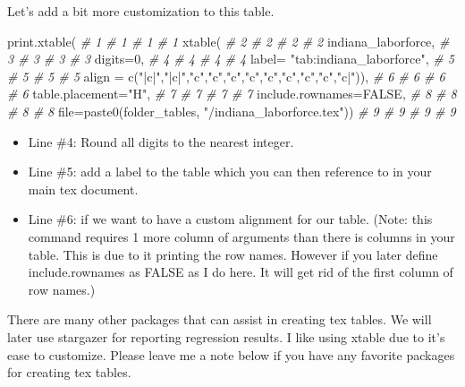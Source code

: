 \documentclass[
]{book}
\newenvironment{Shaded}{\begin{snugshade}}{\end{snugshade}}
\newcommand{\AttributeTok}[1]{\textcolor[rgb]{0.77,0.63,0.00}{#1}}
\newcommand{\CommentTok}[1]{\textcolor[rgb]{0.56,0.35,0.01}{\textit{#1}}}
\newcommand{\ConstantTok}[1]{\textcolor[rgb]{0.00,0.00,0.00}{#1}}
\newcommand{\DecValTok}[1]{\textcolor[rgb]{0.00,0.00,0.81}{#1}}
\newcommand{\FunctionTok}[1]{\textcolor[rgb]{0.00,0.00,0.00}{#1}}
\newcommand{\NormalTok}[1]{#1}
\newcommand{\StringTok}[1]{\textcolor[rgb]{0.31,0.60,0.02}{#1}}
\providecommand{\tightlist}{%
  \setlength{\itemsep}{0pt}\setlength{\parskip}{0pt}}
\begin{document}
Let's add a bit more customization to this table.

\begin{Shaded}
\begin{Highlighting}[]
\FunctionTok{print.xtable}\NormalTok{(                                                     }\CommentTok{\# 1  \# 1  \# 1  \# 1}
  \FunctionTok{xtable}\NormalTok{(                                                         }\CommentTok{\# 2  \# 2  \# 2  \# 2}
\NormalTok{  indiana\_laborforce,                                             }\CommentTok{\# 3  \# 3  \# 3  \# 3}
  \AttributeTok{digits=}\DecValTok{0}\NormalTok{,                                                       }\CommentTok{\# 4  \# 4  \# 4  \# 4}
  \AttributeTok{label=} \StringTok{"tab:indiana\_laborforce"}\NormalTok{,                                }\CommentTok{\# 5  \# 5  \# 5  \# 5}
  \AttributeTok{align =} \FunctionTok{c}\NormalTok{(}\StringTok{"|c|"}\NormalTok{,}\StringTok{"|c|"}\NormalTok{,}\StringTok{"c"}\NormalTok{,}\StringTok{"c"}\NormalTok{,}\StringTok{"c"}\NormalTok{,}\StringTok{"c"}\NormalTok{,}\StringTok{"c"}\NormalTok{,}\StringTok{"c"}\NormalTok{,}\StringTok{"c"}\NormalTok{,}\StringTok{"c"}\NormalTok{,}\StringTok{"c|"}\NormalTok{)),   }\CommentTok{\# 6  \# 6  \# 6  \# 6}
  \AttributeTok{table.placement=}\StringTok{"H"}\NormalTok{,                                            }\CommentTok{\# 7  \# 7  \# 7  \# 7}
  \AttributeTok{include.rownames=}\ConstantTok{FALSE}\NormalTok{,                                         }\CommentTok{\# 8  \# 8  \# 8  \# 8}
  \AttributeTok{file=}\FunctionTok{paste0}\NormalTok{(folder\_tables, }\StringTok{"/indiana\_laborforce.tex"}\NormalTok{))          }\CommentTok{\# 9  \# 9  \# 9  \# 9}
\end{Highlighting}
\end{Shaded}

\begin{itemize}
\tightlist
\item
  Line \#4: Round all digits to the nearest integer.
\item
  Line \#5: add a label to the table which you can then reference to in your main tex document.
\item
  Line \#6: if we want to have a custom alignment for our table. (Note: this command requires 1 more column of arguments than there is columns in your table. This is due to it printing the row names. However if you later define include.rownames as FALSE as I do here. It will get rid of the first column of row names.)
\end{itemize}

There are many other packages that can assist in creating tex tables. We will later use stargazer for reporting regression results. I like using xtable due to it's ease to customize. Please leave me a note below if you have any favorite packages for creating tex tables.

  
\end{document}
